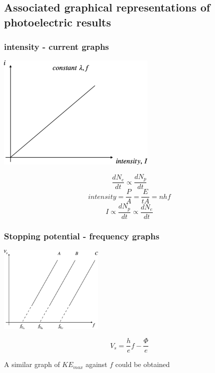\documentclass[a4paper, 10pt]{article}
\begin{document}
\subsection{Associated graphical representations of photoelectric results}
\subsubsection{intensity - current graphs}
\begin{minipage}{0.5\textwidth}
   \begin{center}
    \includegraphics[width=3in]{figures/2.pdf} 
   \end{center}	
\end{minipage}
\begin{minipage}{0.5\textwidth}
   \[
   \frac{dN_e}{dt} \propto \frac{dN_p}{dt}
   \]
   \[
   intensity = \frac{P}{A} = \frac{E}{tA} = nhf
   \]
   \[
   I \propto \frac{dN_p}{dt} \propto \frac{dN_e}{dt}
   \]
\end{minipage}

\subsubsection{Stopping potential - frequency graphs}
\begin{minipage}{0.5\textwidth}
\begin{center}
   \includegraphics[width=5cm]{figures/3.pdf} 
\end{center}	
\end{minipage}
\begin{minipage}{0.5\textwidth}
  \[
     V_s = \frac{h}{e} f - \frac{\Phi}{e}
  \]

  A similar graph of $KE_{max}$ against $f$ could be obtained
\end{minipage}
\end{document}
